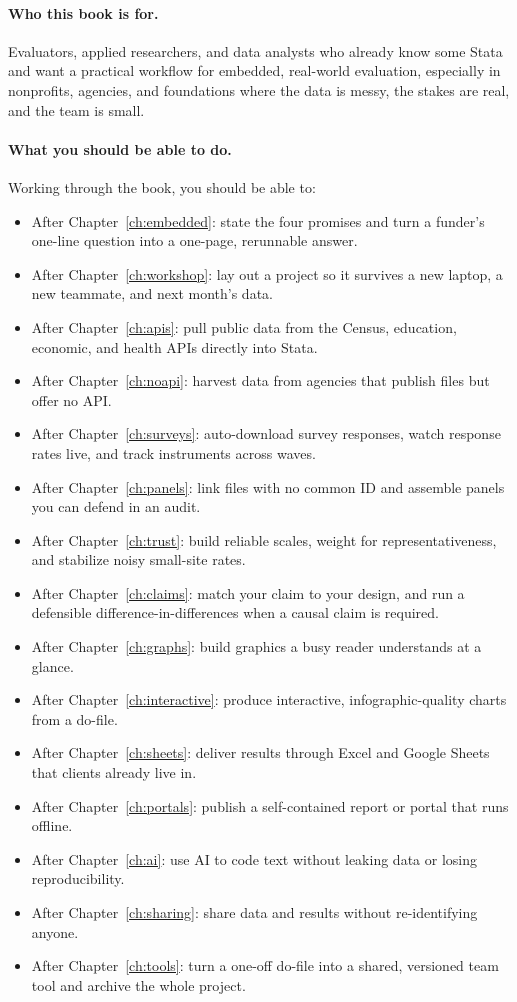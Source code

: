 \documentclass[
    a4paper,
    fontsize=10pt,
    twoside=true,
    numbers=noenddot,
]{kaobook}
\begin{document}
\paragraph{Who this book is for.} Evaluators, applied researchers, and data analysts who already know some Stata and want a practical workflow for embedded, real-world evaluation, especially in nonprofits, agencies, and foundations where the data is messy, the stakes are real, and the team is small.

\paragraph{What you should be able to do.} Working through the book, you should be able to:
\begin{itemize}
    \item After Chapter~\ref{ch:embedded}: state the four promises and turn a funder's one-line question into a one-page, rerunnable answer.
    \item After Chapter~\ref{ch:workshop}: lay out a project so it survives a new laptop, a new teammate, and next month's data.
    \item After Chapter~\ref{ch:apis}: pull public data from the Census, education, economic, and health APIs directly into Stata.
    \item After Chapter~\ref{ch:noapi}: harvest data from agencies that publish files but offer no API.
    \item After Chapter~\ref{ch:surveys}: auto-download survey responses, watch response rates live, and track instruments across waves.
    \item After Chapter~\ref{ch:panels}: link files with no common ID and assemble panels you can defend in an audit.
    \item After Chapter~\ref{ch:trust}: build reliable scales, weight for representativeness, and stabilize noisy small-site rates.
    \item After Chapter~\ref{ch:claims}: match your claim to your design, and run a defensible difference-in-differences when a causal claim is required.
    \item After Chapter~\ref{ch:graphs}: build graphics a busy reader understands at a glance.
    \item After Chapter~\ref{ch:interactive}: produce interactive, infographic-quality charts from a do-file.
    \item After Chapter~\ref{ch:sheets}: deliver results through Excel and Google Sheets that clients already live in.
    \item After Chapter~\ref{ch:portals}: publish a self-contained report or portal that runs offline.
    \item After Chapter~\ref{ch:ai}: use AI to code text without leaking data or losing reproducibility.
    \item After Chapter~\ref{ch:sharing}: share data and results without re-identifying anyone.
    \item After Chapter~\ref{ch:tools}: turn a one-off do-file into a shared, versioned team tool and archive the whole project.
\end{itemize}
\end{document}
